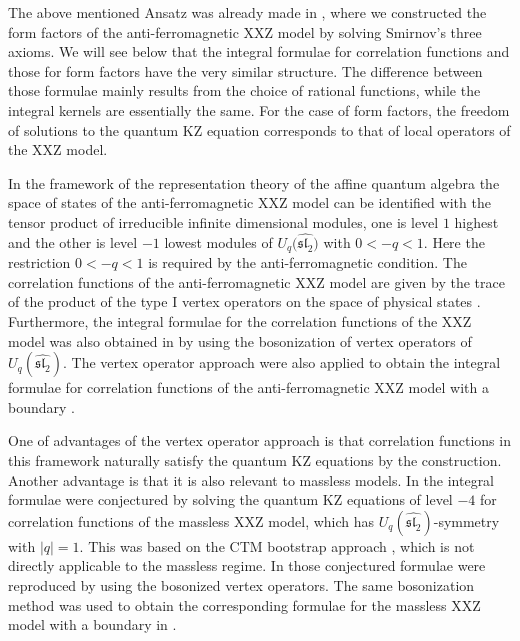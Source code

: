\documentclass[a4paper,10pt]{article}
\begin{document}
The above mentioned Ansatz was already made in 
\cite{JKMQ,KMQ,affine}, where we constructed the 
form factors of the anti-ferromagnetic XXZ model 
by solving Smirnov's three axioms. We will see below 
that the integral formulae for correlation functions 
and those for form factors have the very similar structure. 
The difference between those formulae mainly results 
from the choice of rational functions, while the integral 
kernels are essentially the same. For the case of form 
factors, the freedom of solutions to the quantum KZ equation 
corresponds to that of local operators of the XXZ model. 

In the framework of the representation theory of 
the affine quantum algebra \cite{JMbk} 
the space of states of the anti-ferromagnetic XXZ model can 
be identified with the tensor product of irreducible infinite 
dimensional modules, one is level $1$ highest and the other 
is level $-1$ lowest modules of 
$U_q \bigl( \widehat{\mathfrak{sl}_2}\bigr)$ with 
$0<-q<1$. Here the restriction $0<-q<1$ is required by the 
anti-ferromagnetic condition. The correlation functions of 
the anti-ferromagnetic XXZ model are given by the trace of 
the product of the type I vertex operators on the space of 
physical states \cite{JMbk}. Furthermore, 
the integral formulae for the 
correlation functions of the XXZ model was also obtained 
in \cite{CORR} by using the bosonization of vertex operators 
of $U_q (\widehat{\mathfrak{sl}_2})$. 
The vertex operator approach were also applied to obtain
the integral formulae for correlation functions of the 
anti-ferromagnetic XXZ model with a boundary \cite{JKKKM}. 

One of advantages of the vertex operator approach is 
that correlation functions in this framework naturally 
satisfy the quantum KZ equations by the 
construction. Another advantage is that it is 
also relevant to massless models. 
In \cite{massless-XXZ} the integral formulae were 
conjectured by solving the quantum KZ equations of level 
$-4$ for correlation functions of the massless XXZ 
model, which has $U_q (\widehat{\mathfrak{sl}_2})$-symmetry 
with $|q|=1$. This was based on the CTM bootstrap approach 
\cite{ESM}, which is not directly applicable to the massless 
regime. In \cite{JKM} those conjectured formulae 
were reproduced by using the bosonized vertex operators. 
The same bosonization method was used to 
obtain the corresponding formulae for the massless XXZ model 
with a boundary in \cite{b-massless-XXZ}. 
\end{document}
